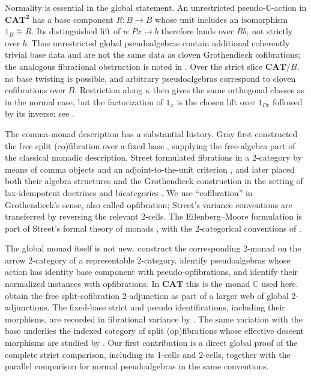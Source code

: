\documentclass[11pt]{article}
\theoremstyle{plain}
\theoremstyle{definition}
\theoremstyle{remark}
\newcommand{\CAT}{\mathbf{CAT}}
\newcommand{\C}{\mathbb{C}}
\numberwithin{equation}{section}
\begin{document}
Normality is essential in the global statement.  An unrestricted
pseudo-$\C$-action in $\CAT^{\mathbf 2}$ has a base component
$R\colon B\to B$ whose unit includes an isomorphism
$1_B\cong R$.  Its distinguished lift of $u\colon Px\to b$ therefore
lands over $Rb$, not strictly over $b$.  Thus unrestricted global
pseudoalgebras contain additional coherently trivial base data and are
not the same data as cloven Grothendieck cofibrations; the analogous
fibrational obstruction is noted in
\citet[Remark~2.7(b)]{EmmeneggerEtAl2024}.  Over the strict slice
$\CAT/B$, no base twisting is possible, and arbitrary pseudoalgebras
correspond to cloven cofibrations over $B$.  Restriction along $\kappa$
then gives the same orthogonal classes as in the normal case, but the
factorization of $1_x$ is the chosen lift over $1_{Px}$ followed by its
inverse; see .

The comma-monad description has a substantial history.  Gray first
constructed the free split (co)fibration over a fixed base
\citep[Theorem~3.9]{Gray1966}, supplying the free-algebra part of the
classical monadic description.  Street formulated fibrations in a 2-category by
means of comma objects and an adjoint-to-the-unit criterion
\citep{Street1974}, and later placed both their algebra structures and
the Grothendieck construction
in the setting of lax-idempotent doctrines and bicategories
\citep{Street1980}.  We use ``cofibration'' in Grothendieck's sense,
also called opfibration; Street's variance conventions are transferred
by reversing the relevant 2-cells.  The Eilenberg--Moore formulation is
part of Street's formal theory of monads \citep{Street1972}, with the
2-categorical conventions of \citet{KellyStreet1974}.

The global monad itself is not new.
\citet[Proposition~16]{FauserVickers2014} construct the corresponding
2-monad on the arrow 2-category of a representable 2-category.
\citet[Proposition~17]{FauserVickers2014} identify pseudoalgebras
whose action has identity base component with pseudo-opfibrations, and
identify their normalized instances with opfibrations.  In $\CAT$
this is the monad $\C$ used here.
\citet[Theorem~8.1]{PeschkeTholen2020} obtain the free
split-cofibration 2-adjunction as part of a larger web of global
2-adjunctions.  The fixed-base strict and pseudo identifications,
including their morphisms, are recorded in fibrational variance by
\citet[Theorem~2.6]{EmmeneggerEtAl2024}.  The same variation with the
base underlies the indexed category of split (op)fibrations whose
effective descent morphisms are studied by
\citet{LucatelliNunesPrezadoSousa2023}.  Our first contribution is a
direct global proof of the complete strict comparison, including its 1-cells
and 2-cells, together with the parallel comparison for normal
pseudoalgebras in the
same conventions.
\end{document}
